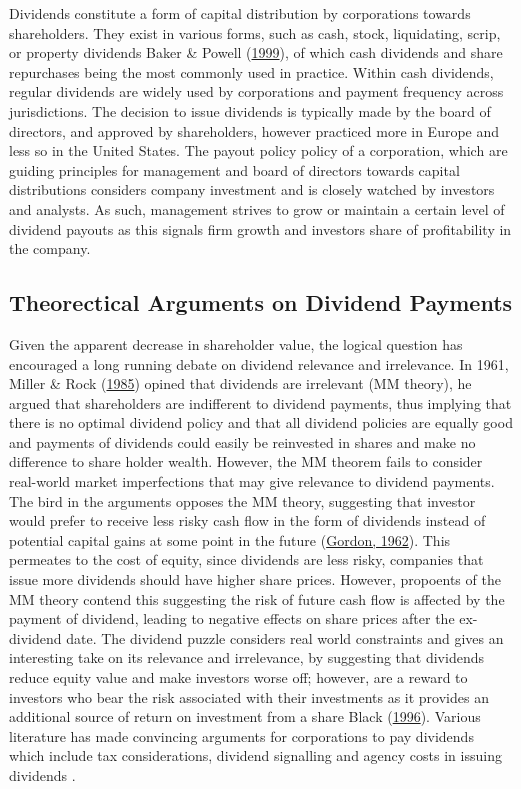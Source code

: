 \documentclass[12pt,preprint, authoryear]{elsarticle}
\numberwithin{equation}{section}
\numberwithin{figure}{section}
\numberwithin{table}{section}
\begin{document}
Dividends constitute a form of capital distribution by corporations
towards shareholders. They exist in various forms, such as cash, stock,
liquidating, scrip, or property dividends Baker \& Powell
(\protect\hyperlink{ref-baker1999corporate}{1999}), of which cash
dividends and share repurchases being the most commonly used in
practice. Within cash dividends, regular dividends are widely used by
corporations and payment frequency across jurisdictions. The decision to
issue dividends is typically made by the board of directors, and
approved by shareholders, however practiced more in Europe and less so
in the United States. The payout policy policy of a corporation, which
are guiding principles for management and board of directors towards
capital distributions considers company investment and is closely
watched by investors and analysts. As such, management strives to grow
or maintain a certain level of dividend payouts as this signals firm
growth and investors share of profitability in the company.

\hypertarget{theorectical-arguments-on-dividend-payments}{%
\subsection{Theorectical Arguments on Dividend
Payments}\label{theorectical-arguments-on-dividend-payments}}

Given the apparent decrease in shareholder value, the logical question
has encouraged a long running debate on dividend relevance and
irrelevance. In 1961, Miller \& Rock
(\protect\hyperlink{ref-miller1985dividend}{1985}) opined that dividends
are irrelevant (MM theory), he argued that shareholders are indifferent
to dividend payments, thus implying that there is no optimal dividend
policy and that all dividend policies are equally good and payments of
dividends could easily be reinvested in shares and make no difference to
share holder wealth. However, the MM theorem fails to consider
real-world market imperfections that may give relevance to dividend
payments. The bird in the arguments opposes the MM theory, suggesting
that investor would prefer to receive less risky cash flow in the form
of dividends instead of potential capital gains at some point in the
future (\protect\hyperlink{ref-gordon1962}{Gordon, 1962}). This
permeates to the cost of equity, since dividends are less risky,
companies that issue more dividends should have higher share prices.
However, propoents of the MM theory contend this suggesting the risk of
future cash flow is affected by the payment of dividend, leading to
negative effects on share prices after the ex-dividend date. The
dividend puzzle considers real world constraints and gives an
interesting take on its relevance and irrelevance, by suggesting that
dividends reduce equity value and make investors worse off; however, are
a reward to investors who bear the risk associated with their
investments as it provides an additional source of return on investment
from a share Black (\protect\hyperlink{ref-black1996dividend}{1996}).
Various literature has made convincing arguments for corporations to pay
dividends which include tax considerations, dividend signalling and
agency costs in issuing dividends .
\end{document}
